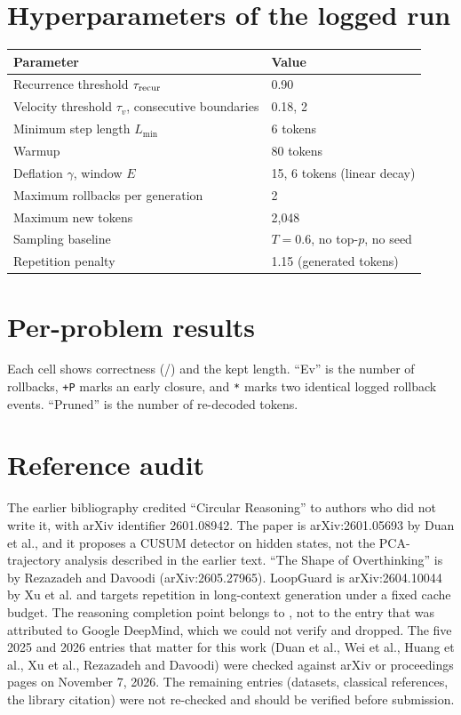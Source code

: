 \documentclass[11pt]{article}
\begin{document}
\appendix

\section{Hyperparameters of the logged run}\label{app:hparams}
\begin{center}
\small
\begin{tabular}{ll}
\toprule
Parameter & Value \\
\midrule
Recurrence threshold $\tau_{\rm recur}$ & 0.90 \\
Velocity threshold $\tau_v$, consecutive boundaries & 0.18, 2 \\
Minimum step length $L_{\min}$ & 6 tokens \\
Warmup & 80 tokens \\
Deflation $\gamma$, window $E$ & 15, 6 tokens (linear decay) \\
Maximum rollbacks per generation & 2 \\
Maximum new tokens & 2{,}048 \\
Sampling baseline & $T=0.6$, no top-$p$, no seed \\
Repetition penalty & 1.15 (generated tokens) \\
\bottomrule
\end{tabular}
\end{center}

\section{Per-problem results}\label{app:perproblem}
Each cell shows correctness (/) and the kept length. ``Ev'' is the number of rollbacks, \texttt{+P} marks an early closure, and \texttt{*} marks two identical logged rollback events. ``Pruned'' is the number of re-decoded tokens.



\section{Reference audit}\label{app:refs}
The earlier bibliography credited ``Circular Reasoning'' to authors who did not write it, with arXiv identifier 2601.08942. The paper is arXiv:2601.05693 by Duan et al., and it proposes a CUSUM detector on hidden states, not the PCA-trajectory analysis described in the earlier text. ``The Shape of Overthinking'' is by Rezazadeh and Davoodi (arXiv:2605.27965). LoopGuard is arXiv:2604.10044 by Xu et al. and targets repetition in long-context generation under a fixed cache budget. The reasoning completion point belongs to \citet{wei2025stop}, not to the entry that was attributed to Google DeepMind, which we could not verify and dropped. The five 2025 and 2026 entries that matter for this work (Duan et al., Wei et al., Huang et al., Xu et al., Rezazadeh and Davoodi) were checked against arXiv or proceedings pages on November 7, 2026. The remaining entries (datasets, classical references, the library citation) were not re-checked and should be verified before submission.
\end{document}
